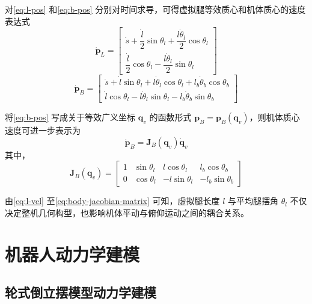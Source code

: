 对\eqref{eq:l-pos} 和\eqref{eq:b-pos} 分别对时间求导，可得虚拟腿等效质心和机体质心的速度表达式
\begin{equation}
  \dot{\boldsymbol{p}}_L =
  \begin{bmatrix}
    \dot{s} + \dfrac{\dot{l}}{2}\sin\theta_l + \dfrac{l\dot{\theta}_l}{2}\cos\theta_l \\
    \dfrac{\dot{l}}{2}\cos\theta_l - \dfrac{l\dot{\theta}_l}{2}\sin\theta_l
  \end{bmatrix}
  \label{eq:l-vel}
\end{equation}
\begin{equation}
  \dot{\boldsymbol{p}}_B =
  \begin{bmatrix}
    \dot{s} + \dot{l}\sin\theta_l + l\dot{\theta}_l\cos\theta_l + l_b\dot{\theta}_b\cos\theta_b \\
    \dot{l}\cos\theta_l - l\dot{\theta}_l\sin\theta_l - l_b\dot{\theta}_b\sin\theta_b
  \end{bmatrix}
  \label{eq:b-vel}
\end{equation}

将\eqref{eq:b-pos} 写成关于等效广义坐标 $\boldsymbol{q}_v$ 的函数形式 $\boldsymbol{p}_B = \boldsymbol{p}_B(\boldsymbol{q}_v)$，则机体质心速度可进一步表示为
\begin{equation}
  \dot{\boldsymbol{p}}_B = \boldsymbol{J}_B(\boldsymbol{q}_v)\dot{\boldsymbol{q}}_v
  \label{eq:body-jacobian}
\end{equation}
其中，
\begin{equation}
  \boldsymbol{J}_B(\boldsymbol{q}_v) =
  \begin{bmatrix}
    1 & \sin\theta_l & l\cos\theta_l & l_b\cos\theta_b \\
    0 & \cos\theta_l & -l\sin\theta_l & -l_b\sin\theta_b
  \end{bmatrix}
  \label{eq:body-jacobian-matrix}
\end{equation}

由\eqref{eq:l-vel} 至\eqref{eq:body-jacobian-matrix} 可知，虚拟腿长度 $l$ 与平均腿摆角 $\theta_l$ 不仅决定整机几何构型，也影响机体平动与俯仰运动之间的耦合关系。

\section{机器人动力学建模}

\subsection{轮式倒立摆模型动力学建模}

